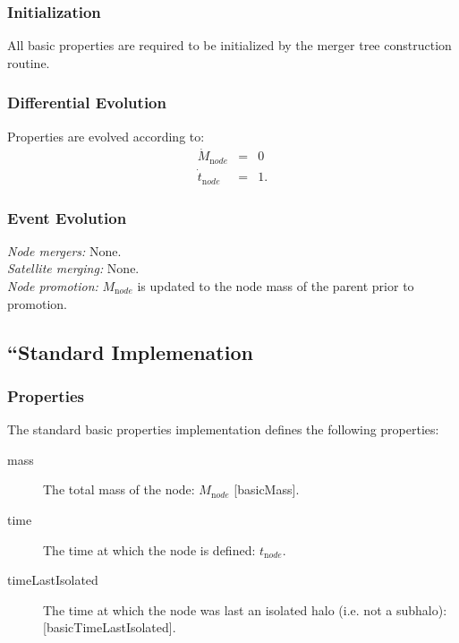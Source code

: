 \subsubsection{Initialization}

All basic properties are required to be initialized by the merger tree construction routine.

\subsubsection{Differential Evolution}

Properties are evolved according to:
\begin{eqnarray}
 \dot{M}_{\mathrm node} &=& 0 \\
 \dot{t}_{\mathrm node} &=& 1.
\end{eqnarray}

\subsubsection{Event Evolution}

\noindent\emph{Node mergers:} None.\\

\noindent\emph{Satellite merging:} None.\\

\noindent\emph{Node promotion:} $M_{\mathrm node}$ is updated to the \gls{node} mass of the parent prior to promotion.\\

\subsection{``Standard Implemenation}

\subsubsection{Properties}

The standard basic properties implementation defines the following properties:
\begin{description}
 \item [{\normalfont \ttfamily mass}] The total mass of the node: $M_{\mathrm node}$ [{\normalfont \ttfamily basicMass}].
 \item [{\normalfont \ttfamily time}] The time at which the \gls{node} is defined: $t_{\mathrm node}$.
 \item [{\normalfont \ttfamily timeLastIsolated}] The time at which the \gls{node} was last an isolated halo (i.e. not a subhalo): [\normalfont \ttfamily basicTimeLastIsolated].
\end{description}

